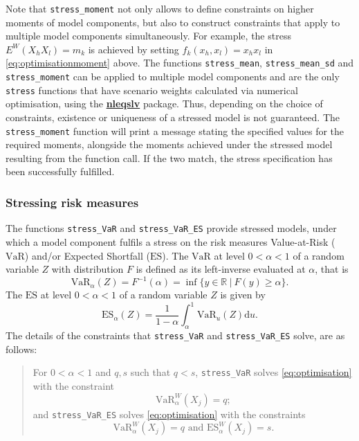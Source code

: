 \documentclass[
]{article}
\begin{document}
Note that \texttt{stress\_moment} not only allows to define constraints on higher moments of model components, but also to construct constraints that apply to multiple model components simultaneously. For example, the stress \(E^W(X_h X_l) =m_k\) is achieved by setting \(f_k(x_h, x_l) = x_h x_l\) in \eqref{eq:optimisationmoment} above. The functions \texttt{stress\_mean}, \texttt{stress\_mean\_sd} and \texttt{stress\_moment} can be applied to multiple model components and are the only \texttt{stress} functions that have scenario weights calculated via numerical optimisation, using the \href{https://CRAN.R-project.org/package=nleqslv}{\textbf{nleqslv}} package. Thus, depending on the choice of constraints, existence or uniqueness of a stressed model is not guaranteed. The \texttt{stress\_moment} function will print a message stating the specified values for the required moments, alongside the moments achieved under the stressed model resulting from the function call. If the two match, the stress specification has been successfully fulfilled.

\hypertarget{Sec:RiskMeasures}{%
\subsubsection{Stressing risk measures}\label{Sec:RiskMeasures}}

The functions \texttt{stress\_VaR} and \texttt{stress\_VaR\_ES} provide stressed models, under which a model component fulfils a stress on the risk measures Value-at-Risk (\(\text{VaR}\)) and/or Expected Shortfall (\(\text{ES}\)). The \(\text{VaR}\) at level \(0 < \alpha < 1\) of a random variable \(Z\) with distribution \(F\) is defined as its left-inverse evaluated at \(\alpha\), that is
\[\text{VaR}_\alpha(Z) = F^{-1}(\alpha) = \inf\{ y \in \mathbb{R} ~|~F(y) \geq \alpha\}.\]
The \(\text{ES}\) at level \(0 < \alpha < 1\) of a random variable \(Z\) is given by \[\text{ES}_\alpha(Z) =\frac{1}{1-\alpha}\int_\alpha^1 \text{VaR}_u(Z) \mathrm{d}u.\]
The details of the constraints that \texttt{stress\_VaR} and \texttt{stress\_VaR\_ES} solve, are as follows:

\begin{quote}
For \(0< \alpha <1\) and \(q, s\) such that \(q < s\), \texttt{stress\_VaR} solves \eqref{eq:optimisation} with the constraint
\begin{equation} 
\text{VaR}_{\alpha }^W(X_j) = q;  \label{eq:optimisationVaR}
\end{equation}
and \texttt{stress\_VaR\_ES} solves \eqref{eq:optimisation} with the constraints
\begin{equation}                                                
\text{VaR}_{\alpha }^W(X_j) = q \text{ and ES}_{\alpha }^W(X_j) = s.\label{eq:optimisationVaRES}
\end{equation}
\end{quote}
\end{document}
